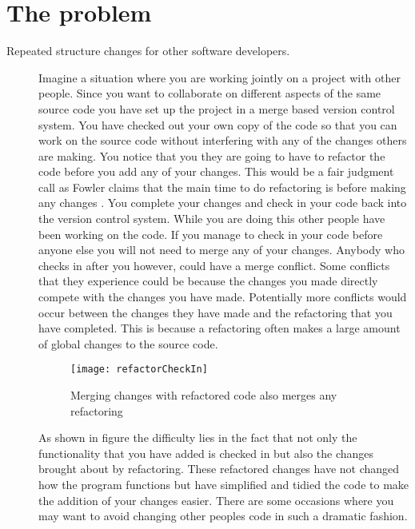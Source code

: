 \section{The problem}
\begin{description}
\item [Repeated structure changes for other software developers.]
Imagine a situation where you are working jointly on a project with other people. Since you want to collaborate on different aspects of the same source code you have set up the project in a merge based version control system.  You have checked out your own copy of the code so that you can work on the source code without interfering with any of the changes others are making. You notice that you they are going to have to refactor the code before you add any of your changes.  This would be a fair judgment call as Fowler claims that the main time to do refactoring is before making any changes \cite{Fowler1999}. You complete your changes and check in your code back into the version control system.  While you are doing this other people have been working on the code.  If you manage to check in your code before anyone else you will not need to merge any of your changes.  Anybody who checks in after you however, could have a merge conflict.  Some conflicts that they experience could be because the changes you made directly compete with the changes you have made. Potentially more conflicts would occur between the changes they have made and the refactoring that you have completed. This is because a refactoring often makes a large amount of global changes to the source code.

\begin{figure}
\begin{center}
\texttt{[image: refactorCheckIn]}
\end{center}
\caption{Merging changes with refactored code also merges any refactoring}
\end{figure}

As shown in figure the difficulty lies in the fact that not only the functionality that you have added is checked in but also the changes brought about by refactoring.  These refactored changes have not changed how the program functions but have simplified and tidied the code to make the addition of your changes easier. There are some occasions where you may want to avoid changing other peoples code in such a dramatic fashion.


\end{description}
